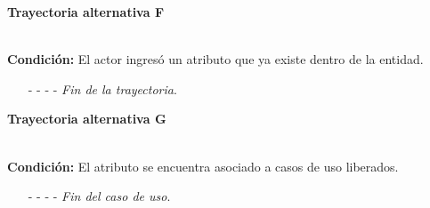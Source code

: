 \hypertarget{CU7-1-2:TAF}{\textbf{Trayectoria alternativa F}}\\
\noindent \textbf{Condición:} El actor ingresó un atributo que ya existe dentro de la entidad.
\begin{enumerate}
	\UCpaso[\UCsist] Muestra el mensaje  señalando el campo que presenta la duplicidad en la pantalla .
	\UCpaso Regresa al paso \ref{CU7.1.2-P4} de la trayectoria principal.
	\item[- -] - - {\em {Fin de la trayectoria}}.
\end{enumerate}
\hypertarget{CU7-1-2:TAG}{\textbf{Trayectoria alternativa G}}\\
\noindent \textbf{Condición:} El atributo se encuentra asociado a casos de uso liberados.
\begin{enumerate}
	\UCpaso[\UCsist] Oculta el botón \editar del atributo que esta asociado a casos de uso liberados.
	\item[- -] - - {\em {Fin del caso de uso}}.
\end{enumerate}
